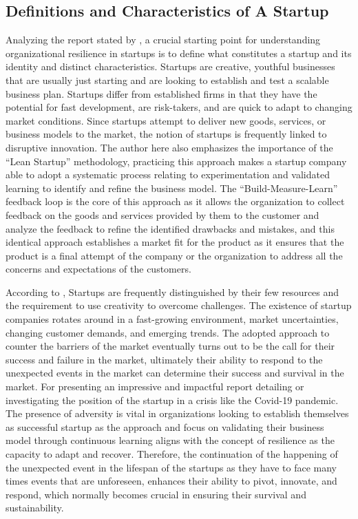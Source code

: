 \documentclass[12pt]{article}
\begin{document}
\subsection{Definitions and Characteristics of A Startup}
Analyzing the report stated by \citep{sreenivasan2023modelling}, a crucial starting point for understanding organizational resilience in startups is to define what constitutes a startup and its identity and distinct characteristics. Startups are creative, youthful businesses that are usually just starting and are looking to establish and test a scalable business plan. Startups differ from established firms in that they have the potential for fast development, are risk-takers, and are quick to adapt to changing market conditions. Since startups attempt to deliver new goods, services, or business models to the market, the notion of startups is frequently linked to disruptive innovation. The author here also emphasizes the importance of the “Lean Startup” methodology, practicing this approach makes a startup company able to adopt a systematic process relating to experimentation and validated learning to identify and refine the business model.  The “Build-Measure-Learn” feedback loop is the core of this approach as it allows the organization to collect feedback on the goods and services provided by them to the customer and analyze the feedback to refine the identified drawbacks and mistakes, and this identical approach establishes a market fit for the product as it ensures that the product is a final attempt of the company or the organization to address all the concerns and expectations of the customers. 

According to \citep{raj2022developing}, Startups are frequently distinguished by their few resources and the requirement to use creativity to overcome challenges. The existence of startup companies rotates around in a fast-growing environment, market uncertainties, changing customer demands, and emerging trends. The adopted approach to counter the barriers of the market eventually turns out to be the call for their success and failure in the market, ultimately their ability to respond to the unexpected events in the market can determine their success and survival in the market. For presenting an impressive and impactful report detailing or investigating the position of the startup in a crisis like the Covid-19 pandemic. The presence of adversity is vital in organizations looking to establish themselves as successful startup as the approach and focus on validating their business model through continuous learning aligns with the concept of resilience as the capacity to adapt and recover. Therefore, the continuation of the happening of the unexpected event in the lifespan of the startups as they have to face many times events that are unforeseen, enhances their ability to pivot, innovate, and respond, which normally becomes crucial in ensuring their survival and sustainability.
\end{document}
